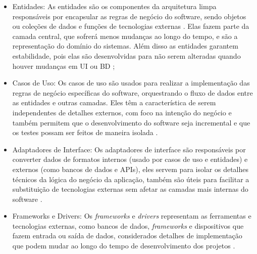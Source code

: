     \begin{itemize}
        \item Entidades: As entidades são os componentes da arquitetura limpa responsáveis por encapsular as regras de negócio do software, sendo objetos ou coleções de dados e funções de tecnologias externas \cite{livro:martin:cleanarch, artigo:ferreira:2022, artigo:dantas:2021}. Elas fazem parte da camada central, que sofrerá menos mudanças ao longo do tempo, e são a representação do domínio do sistemas. Além disso  as entidades garantem estabilidade, pois elas são desenvolvidas para não serem alteradas quando houver mudanças em UI ou BD \cite{artigo:dantas:2021, livro:martin:cleanarch};

        \item Casos de Uso: Os casos de uso são usados para realizar a implementação das regras de negócio específicas do software, orquestrando o fluxo de dados entre as entidades e outras camadas. Eles têm a característica de serem independentes de detalhes externos, com foco na intenção do negócio e também permitem que o desenvolvimento do software seja incremental e que os testes possam ser feitos de maneira isolada \cite{artigo:ferreira:2022, livro:martin:cleanarch}.

        \item Adaptadores de Interface: Os adaptadores de interface são responsáveis por converter dados de formatos internos (usado por casos de uso e entidades) e externos (como bancos de dados e APIs), eles servem para isolar os detalhes técnicos da lógica do negócio da aplicação, também são úteis para facilitar a substituição de tecnologias externas sem afetar as camadas mais internas do software \cite{livro:martin:cleanarch}. 

        \item Frameworks e Drivers: Os \textit{frameworks} e \textit{drivers} representam as ferramentas e tecnologias externas, como bancos de dados, \textit{frameworks} e dispositivos que fazem entrada ou saída de dados, considerados detalhes de implementação que podem mudar ao longo do tempo de desenvolvimento dos projetos \cite{livro:martin:cleanarch}.
    \end{itemize}